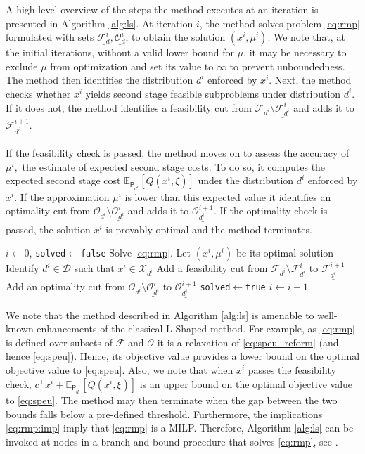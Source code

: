 \documentclass[12pt]{article}
\theoremstyle{thmstylethree}%
\newcommand{\mtc}[1] {\mathcal{#1}}
\newcommand{\pr}[1]{\ensuremath{\mathsf{#1}}}
\def\Ex{\ensuremath{\mathbb{E}}}
\begin{document}
A high-level overview of the steps the method executes at an iteration is presented in Algorithm \ref{alg:ls}. 
At iteration $i$, the method solves problem \eqref{eq:rmp} formulated with sets $\underline{\mtc{F}_{d}^{i}},  \underline{\mtc{O}_{d}^{i}}$, to obtain the solution $(x^i,\mu^i)$.
We note that, at the initial iterations, without a valid lower bound for $\mu$, it may be necessary to exclude $\mu$ from optimization and set its value to $\infty$ to prevent unboundedness. 
The method then identifies the distribution $d^i$ enforced by $x^i$. 
Next, the method checks whether $x^i$ yields second stage feasible subproblems under distribution $d^i$.
If it does not, the method identifies a feasibility cut from $\mtc{F}_{d^i} \setminus \underline{\mtc{F}_{d^i}^i}$ and adds it to $\underline{\mtc{F}_{d^i}^{i+1}}$.


If the feasibility check is passed, the method moves on to assess the accuracy of $\mu^i,$ the estimate of expected second stage costs.
To do so, it computes the expected second stage cost $\Ex_{\pr{P}_{d^i}}[Q(x^i,\xi)]$ under the distribution $d^i$ enforced by $x^i$. 
If the approximation $\mu^i$ is lower than this expected value it identifies an optimality cut from  $\mtc{O}_{d^i} \setminus \underline{\mtc{O}_{d^i}^i}$ and adds it to $\underline{\mtc{O}_{d^i}^{i+1}}$.
If the optimality check is passed, the solution $x^i$ is provably optimal and the method terminates. 

\begin{algorithm}[htp]
\caption{L-Shaped Method for \eqref{eq:speu}}\label{alg:ls}
\begin{algorithmic}
\State $i\gets 0$, \texttt{solved}$\gets$\texttt{false}
\State Solve \eqref{eq:rmp}. Let $(x^i,\mu^i)$ be its optimal solution
\State Identify $d^i\in\mtc{D}$ such that $x^i\in\mtc{X}_{d^i}$
    \State Add a feasibility cut from $\mtc{F}_{d^i} \setminus \underline{\mtc{F}_{d^i}^{i}}$ to $\underline{\mtc{F}_{d^i}^{i+1}}$
\ElsIf{$\mu^i<\Ex_{\pr{P}_{d^i}}[Q(x^i,\xi)]$ }
    \State Add an optimality cut from $\mtc{O}_{d^i} \setminus \underline{\mtc{O}_{d^i}^i}$ to $\underline{\mtc{O}_{d^i}^{i+1}}$
\Else   
    \State \texttt{solved}$\gets$\texttt{true}
\EndIf
\State $i\gets i+1$
\EndWhile
\end{algorithmic}
\end{algorithm}
We note that the method described in Algorithm \ref{alg:ls} is amenable to well-known enhancements of the classical L-Shaped method.
For example, as \eqref{eq:rmp} is defined over subsets of $\mtc{F}$ and $\mtc{O}$ it is a relaxation of \eqref{eq:speu_reform} (and hence \eqref{eq:speu}). Hence, its objective value provides a lower bound on the optimal objective value to \eqref{eq:speu}. 
Also, we note that when $x^i$ passes the feasibility check, $c^\top x^i + \Ex_{\pr{P}_{d^i}}[Q(x^i,\xi)]$ is an upper bound on the optimal objective value to \eqref{eq:speu}. 
The method may then terminate when the gap between the two bounds falls below a pre-defined threshold.  
Furthermore, the implications \eqref{eq:rmp:imp} imply that \eqref{eq:rmp} is a MILP. Therefore, Algorithm \ref{alg:ls} can be invoked at nodes in a branch-and-bound procedure that solves \eqref{eq:rmp}, see \cite{LapL93}.
\end{document}
